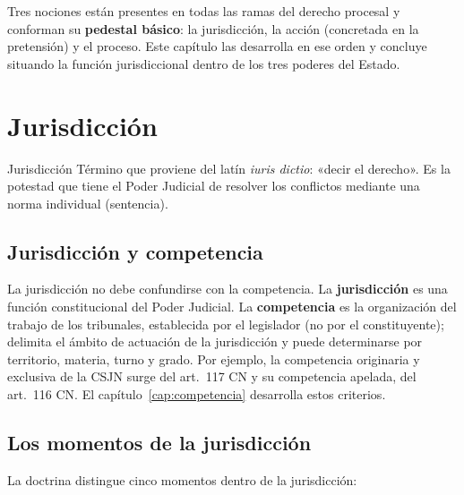 \documentclass[12pt,oneside]{book}
\begin{document}
Tres nociones están presentes en todas las ramas del derecho procesal y conforman su \textbf{pedestal básico}: la jurisdicción, la acción (concretada en la pretensión) y el proceso. Este capítulo las desarrolla en ese orden y concluye situando la función jurisdiccional dentro de los tres poderes del Estado.

\section{Jurisdicción}

\begin{definicion}{Jurisdicción}
Término que proviene del latín \textit{iuris dictio}: «decir el derecho». Es la potestad que tiene el Poder Judicial de resolver los conflictos mediante una norma individual (sentencia).
\end{definicion}

\subsection{Jurisdicción y competencia}

La jurisdicción no debe confundirse con la competencia. La \textbf{jurisdicción} es una función constitucional del Poder Judicial. La \textbf{competencia} es la organización del trabajo de los tribunales, establecida por el legislador (no por el constituyente); delimita el ámbito de actuación de la jurisdicción y puede determinarse por territorio, materia, turno y grado. Por ejemplo, la competencia originaria y exclusiva de la CSJN surge del art.~117 CN y su competencia apelada, del art.~116 CN. El capítulo~\ref{cap:competencia} desarrolla estos criterios.

\subsection{Los momentos de la jurisdicción}

La doctrina distingue cinco momentos dentro de la jurisdicción:
\end{document}
